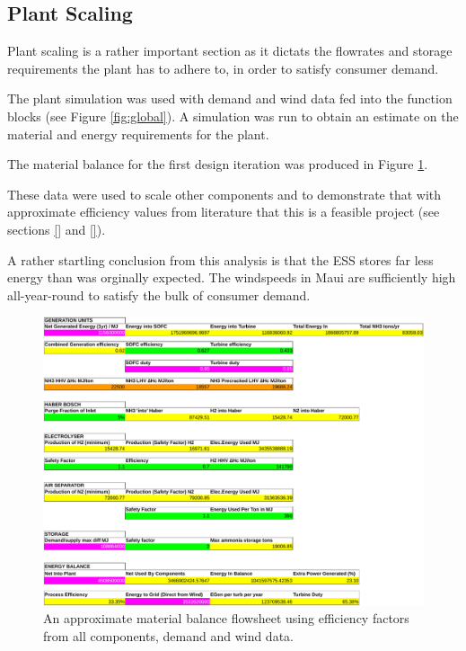 \subsection{Plant Scaling}
\label{sec:plantscale}

Plant scaling is a rather important section as it dictats the flowrates and storage requirements the plant has to adhere to, in order to satisfy consumer demand.

The plant simulation was used with demand and wind data fed into the function blocks (see Figure \ref{fig:global}). A simulation was run to obtain an estimate on the material and energy requirements for the plant.

The material balance for the first design iteration was produced in Figure \ref{flowsheettbl}.

These data were used to scale other components and to demonstrate that with approximate efficiency values from literature that this is a feasible project (see sections \ref{} and \ref{}).

A rather startling conclusion from this analysis is that the ESS stores far less energy than was orginally expected.
The windspeeds in Maui are sufficiently high all-year-round to satisfy the bulk of consumer demand.

\begin{figure}[tbh]
    \centering
    \includegraphics[scale=0.9]{images/flowtable.pdf}
    \caption{An approximate material balance flowsheet using efficiency factors from all components, demand and wind data.}
    \label{flowsheettbl}
\end{figure}